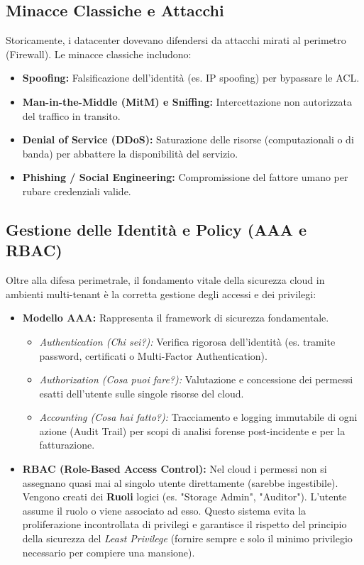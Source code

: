 \subsection{Minacce Classiche e Attacchi}
Storicamente, i datacenter dovevano difendersi da attacchi mirati al perimetro (Firewall). Le minacce classiche includono:
\begin{itemize}
    \item \textbf{Spoofing:} Falsificazione dell'identità (es. IP spoofing) per bypassare le ACL.
    \item \textbf{Man-in-the-Middle (MitM) e Sniffing:} Intercettazione non autorizzata del traffico in transito.
    \item \textbf{Denial of Service (DDoS):} Saturazione delle risorse (computazionali o di banda) per abbattere la disponibilità del servizio.
    \item \textbf{Phishing / Social Engineering:} Compromissione del fattore umano per rubare credenziali valide.
\end{itemize}

\subsection{Gestione delle Identità e Policy (AAA e RBAC)}
Oltre alla difesa perimetrale, il fondamento vitale della sicurezza cloud in ambienti multi-tenant è la corretta gestione degli accessi e dei privilegi:
\begin{itemize}
    \item \textbf{Modello AAA:} Rappresenta il framework di sicurezza fondamentale.
    \begin{itemize}
        \item \textit{Authentication (Chi sei?):} Verifica rigorosa dell'identità (es. tramite password, certificati o Multi-Factor Authentication).
        \item \textit{Authorization (Cosa puoi fare?):} Valutazione e concessione dei permessi esatti dell'utente sulle singole risorse del cloud.
        \item \textit{Accounting (Cosa hai fatto?):} Tracciamento e logging immutabile di ogni azione (Audit Trail) per scopi di analisi forense post-incidente e per la fatturazione.
    \end{itemize}
    \item \textbf{RBAC (Role-Based Access Control):} Nel cloud i permessi non si assegnano quasi mai al singolo utente direttamente (sarebbe ingestibile). Vengono creati dei \textbf{Ruoli} logici (es. "Storage Admin", "Auditor"). L'utente assume il ruolo o viene associato ad esso. Questo sistema evita la proliferazione incontrollata di privilegi e garantisce il rispetto del principio della sicurezza del \textit{Least Privilege} (fornire sempre e solo il minimo privilegio necessario per compiere una mansione).
\end{itemize}

